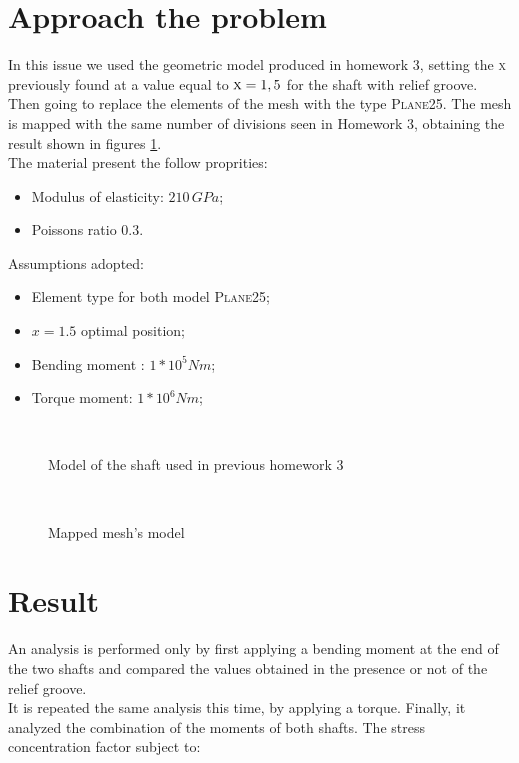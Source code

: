 \section{Approach the problem}
In this issue we used the geometric model produced in homework 3, setting the \textsc{x} previously found at a value equal to $\textsc{x} = 1,5$ for the shaft with relief groove. Then going to replace the elements of the mesh with the type \textsc{Plane25}. The mesh is mapped with the same number of divisions seen in Homework 3, obtaining the result shown in figures \ref{img:HW7-Geometry}.\\
The material present the follow proprities:
\begin{itemize}
\item Modulus of elasticity: $210\, GPa$;
\item Poissons ratio $0.3$.
\end{itemize}
Assumptions adopted:
\begin{itemize}
\item Element type for both model \textsc{Plane25};
\item $x = 1.5$ optimal position;
\item Bending moment : $1*10^5 Nm$;
\item Torque moment: $1*10^6 Nm$;
\end{itemize}
\begin{figure}[htb]
\centering
{} \\
\caption{Model of the shaft used in previous homework 3}
\label{img:HW7-Geometry}
\end{figure}
\begin{figure}[!h]
\centering
{} \\
\label{img:HW3-meshed}
\caption{Mapped mesh's model}
\end{figure}\pagebreak
\newpage
\section{Result}
An analysis is performed only by first applying a bending moment at the end of the two shafts and compared the values obtained in the presence or not of the relief groove.\\ It is repeated the same analysis this time, by applying a torque.
Finally, it analyzed the combination of the moments of both shafts.
The stress concentration factor subject to:

